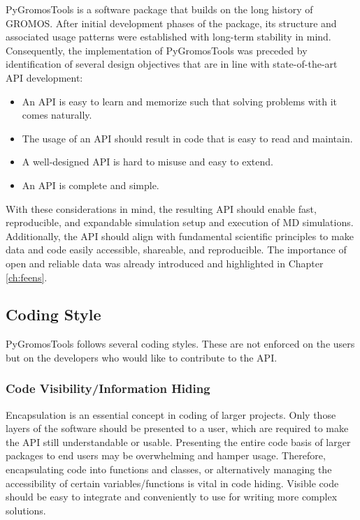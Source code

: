 PyGromosTools is a software package that builds on the long history of GROMOS. After initial development phases of the package, its structure and associated usage patterns were established with long-term stability in mind. Consequently, the implementation of PyGromosTools was preceded by identification of several design objectives that are in line with state-of-the-art API development: \cite{Henning2009, Blanchette2008, Bloch2006}
%
\begin{itemize}
    \item An API is easy to learn and memorize such that solving problems with it comes naturally. 
    \item The usage of an API should result in code that is easy to read and maintain.
    \item A well-designed API is hard to misuse and easy to extend.
    \item An API is complete and simple. 
\end{itemize}
%
With these considerations in mind, the resulting API should enable fast, reproducible, and expandable simulation setup and execution of MD simulations. Additionally, the API should align with fundamental scientific principles to make data and code easily accessible, shareable, and reproducible. The importance of open and reliable data was already introduced and highlighted in Chapter \ref{ch:feens}.

\subsection{Coding Style}
PyGromosTools follows several coding styles. These are not enforced on the users but on the developers who would like to contribute to the API. 

\subsubsection{Code Visibility/Information Hiding}
Encapsulation is an essential concept in coding of larger projects. Only those layers of the software should be presented to a user, which are required to make the API still understandable or usable. Presenting the entire code basis of larger packages to end users may be overwhelming and hamper usage. Therefore, encapsulating code into functions and classes, or alternatively managing the accessibility of certain variables/functions is vital in code hiding.\cite{Leino2002, Ganney2020} Visible code should be easy to integrate and conveniently to use for writing more complex solutions.

